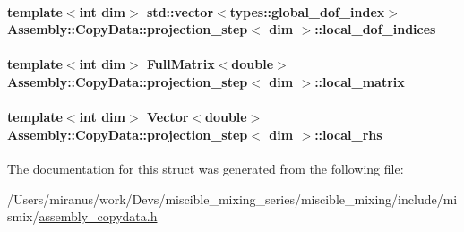 \paragraph[{local\+\_\+dof\+\_\+indices}]{\setlength{\rightskip}{0pt plus 5cm}template$<$int dim$>$ std\+::vector$<$types\+::global\+\_\+dof\+\_\+index$>$ {\bf Assembly\+::\+Copy\+Data\+::projection\+\_\+step}$<$ dim $>$\+::local\+\_\+dof\+\_\+indices}\label{struct_assembly_1_1_copy_data_1_1projection__step_a96eade218526cf002d141d536572b75d}
\hypertarget{struct_assembly_1_1_copy_data_1_1projection__step_afd29a90013688a947f0100bd4541e1d1}{}
\paragraph[{local\+\_\+matrix}]{\setlength{\rightskip}{0pt plus 5cm}template$<$int dim$>$ Full\+Matrix$<$double$>$ {\bf Assembly\+::\+Copy\+Data\+::projection\+\_\+step}$<$ dim $>$\+::local\+\_\+matrix}\label{struct_assembly_1_1_copy_data_1_1projection__step_afd29a90013688a947f0100bd4541e1d1}
\hypertarget{struct_assembly_1_1_copy_data_1_1projection__step_afe718ce6054f5dc781f60bdc2b1bdc82}{}
\paragraph[{local\+\_\+rhs}]{\setlength{\rightskip}{0pt plus 5cm}template$<$int dim$>$ Vector$<$double$>$ {\bf Assembly\+::\+Copy\+Data\+::projection\+\_\+step}$<$ dim $>$\+::local\+\_\+rhs}\label{struct_assembly_1_1_copy_data_1_1projection__step_afe718ce6054f5dc781f60bdc2b1bdc82}


The documentation for this struct was generated from the following file\+:\begin{DoxyCompactItemize}
\item 
/\+Users/miranus/work/\+Devs/miscible\+\_\+mixing\+\_\+series/miscible\+\_\+mixing/include/mismix/\hyperlink{assembly__copydata_8h}{assembly\+\_\+copydata.\+h}\end{DoxyCompactItemize}
